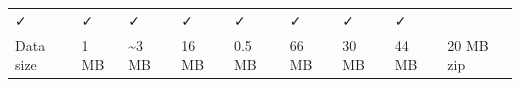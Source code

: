 \documentclass[11pt]{article}
\begin{document}
{\begin{longtable}[]{@{}lllllllll@{}}
\begin{minipage}[t]{0.08\columnwidth}
✓\strut
\end{minipage} & \begin{minipage}[t]{0.08\columnwidth}\raggedright
✓\strut
\end{minipage} & \begin{minipage}[t]{0.08\columnwidth}\raggedright
✓\strut
\end{minipage} & \begin{minipage}[t]{0.08\columnwidth}\raggedright
✓\strut
\end{minipage} & \begin{minipage}[t]{0.08\columnwidth}\raggedright
✓\strut
\end{minipage} & \begin{minipage}[t]{0.08\columnwidth}\raggedright
✓\strut
\end{minipage} & \begin{minipage}[t]{0.08\columnwidth}\raggedright
✓\strut
\end{minipage} & \begin{minipage}[t]{0.08\columnwidth}\raggedright
✓\strut
\end{minipage}\tabularnewline
\begin{minipage}[t]{0.08\columnwidth}\raggedright
Data size\strut
\end{minipage} & \begin{minipage}[t]{0.08\columnwidth}\raggedright
1 MB\strut
\end{minipage} & \begin{minipage}[t]{0.08\columnwidth}\raggedright
\textasciitilde3 MB\strut
\end{minipage} & \begin{minipage}[t]{0.08\columnwidth}\raggedright
16 MB\strut
\end{minipage} & \begin{minipage}[t]{0.08\columnwidth}\raggedright
0.5 MB\strut
\end{minipage} & \begin{minipage}[t]{0.08\columnwidth}\raggedright
66 MB\strut
\end{minipage} & \begin{minipage}[t]{0.08\columnwidth}\raggedright
30 MB\strut
\end{minipage} & \begin{minipage}[t]{0.08\columnwidth}\raggedright
44 MB\strut
\end{minipage} & \begin{minipage}[t]{0.08\columnwidth}\raggedright
20 MB zip\strut
\end{minipage}\tabularnewline
\bottomrule
\end{longtable}
}
\end{document}
